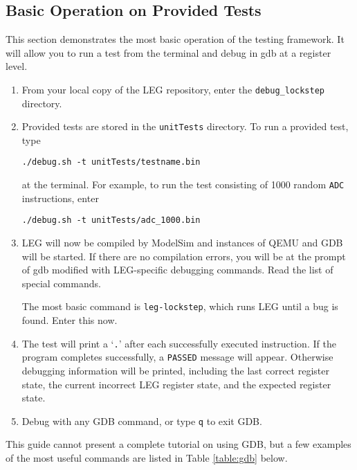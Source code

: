 \subsection{Basic Operation on Provided Tests}
This section demonstrates the most basic operation of the testing framework.
It will allow you to run a test from the terminal and debug in gdb at a register level.
\begin{enumerate}
\item From your local copy of the LEG repository, enter the \texttt{debug\_lockstep} directory.
\item Provided tests are stored in the \texttt{unitTests} directory. 
 To run a provided test, type 
 \begin{verbatim}./debug.sh -t unitTests/testname.bin\end{verbatim}
 at the terminal. For example, to run the test consisting of 1000 random \texttt{ADC} instructions, enter 
 \begin{verbatim}./debug.sh -t unitTests/adc_1000.bin\end{verbatim}
\item LEG will now be compiled by ModelSim and instances of QEMU and GDB will be started.
 If there are no compilation errors, you will be at the prompt of gdb modified with LEG-specific debugging commands.
 Read the list of special commands.
 
 The most basic command is \texttt{leg-lockstep}, which runs LEG until a bug is found.
 Enter this now.
\item The test will print a `\texttt{.}' after each successfully executed instruction.
 If the program completes successfully, a \texttt{PASSED} message will appear.
 Otherwise debugging information will be printed, including the last correct register state, the current incorrect LEG register state, and the expected register state.
\item Debug with any GDB command, or type \texttt{q} to exit GDB.
\end{enumerate}

This guide cannot present a complete tutorial on using GDB, but a few examples of the most useful commands are listed in Table \ref{table:gdb} below.

